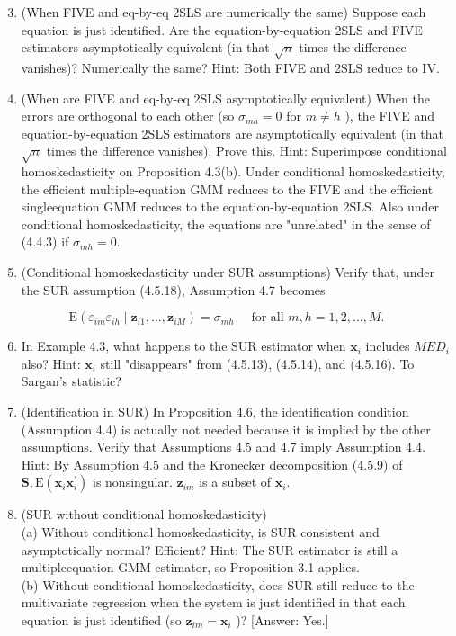 \documentclass[10pt]{article}
\begin{document}
\begin{enumerate}
  \setcounter{enumi}{2}
  \item (When FIVE and eq-by-eq 2SLS are numerically the same) Suppose each equation is just identified. Are the equation-by-equation 2SLS and FIVE estimators asymptotically equivalent (in that $\sqrt{n}$ times the difference vanishes)? Numerically the same? Hint: Both FIVE and 2SLS reduce to IV.
  \item (When are FIVE and eq-by-eq 2SLS asymptotically equivalent) When the errors are orthogonal to each other (so $\sigma_{m h}=0$ for $m \neq h$ ), the FIVE and equation-by-equation 2SLS estimators are asymptotically equivalent (in that $\sqrt{n}$ times the difference vanishes). Prove this. Hint: Superimpose conditional homoskedasticity on Proposition 4.3(b). Under conditional homoskedasticity, the efficient multiple-equation GMM reduces to the FIVE and the efficient singleequation GMM reduces to the equation-by-equation 2SLS. Also under conditional homoskedasticity, the equations are "unrelated" in the sense of (4.4.3) if $\sigma_{m h}=0$.
  \item (Conditional homoskedasticity under SUR assumptions) Verify that, under the SUR assumption (4.5.18), Assumption 4.7 becomes
\end{enumerate}

$$
\mathrm{E}\left(\varepsilon_{i m} \varepsilon_{i h} \mid \mathbf{z}_{i 1}, \ldots, \mathbf{z}_{i M}\right)=\sigma_{m h} \quad \text { for all } m, h=1,2, \ldots, M .
$$

\begin{enumerate}
  \setcounter{enumi}{5}
  \item In Example 4.3, what happens to the SUR estimator when $\mathbf{x}_{i}$ includes $M E D_{i}$ also? Hint: $\mathbf{x}_{i}$ still "disappears" from (4.5.13), (4.5.14), and (4.5.16). To Sargan's statistic?
  \item (Identification in SUR) In Proposition 4.6, the identification condition (Assumption 4.4) is actually not needed because it is implied by the other assumptions. Verify that Assumptions 4.5 and 4.7 imply Assumption 4.4. Hint: By Assumption 4.5 and the Kronecker decomposition (4.5.9) of $\mathbf{S}, \mathrm{E}\left(\mathbf{x}_{i} \mathbf{x}_{i}^{\prime}\right)$ is nonsingular. $\mathbf{z}_{i m}$ is a subset of $\mathbf{x}_{i}$.
  \item (SUR without conditional homoskedasticity)\\
(a) Without conditional homoskedasticity, is SUR consistent and asymptotically normal? Efficient? Hint: The SUR estimator is still a multipleequation GMM estimator, so Proposition 3.1 applies.\\
(b) Without conditional homoskedasticity, does SUR still reduce to the multivariate regression when the system is just identified in that each equation is just identified (so $\mathbf{z}_{i m}=\mathbf{x}_{i}$ )? [Answer: Yes.]
\end{enumerate}
\end{document}
